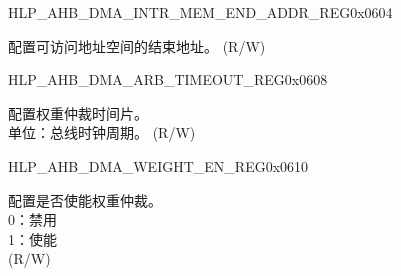 \begin{register}{H}{LP\_AHB\_DMA\_INTR\_MEM\_END\_ADDR\_REG}{0x0604}\label{regdesc:LPAHBDMAINTRMEMENDADDRREG}
%
\regnewline%
\begin{regdesc}\begin{reglist}
\label{fielddesc:LPAHBDMAACCESSINTRMEMENDADDR}\item [LP\_AHB\_DMA\_ACCESS\_INTR\_MEM\_END\_ADDR] 配置可访问地址空间的结束地址。 (R/W)
\end{reglist}\end{regdesc}
\end{register}


\begin{register}{H}{LP\_AHB\_DMA\_ARB\_TIMEOUT\_REG}{0x0608}\label{regdesc:LPAHBDMAARBTIMEOUTREG}
%
%
\regnewline%
\begin{regdesc}\begin{reglist}
\label{fielddesc:LPAHBDMAARBTIMEOUT}\item [LP\_AHB\_DMA\_ARB\_TIMEOUT] 配置权重仲裁时间片。\\单位：总线时钟周期。 (R/W)
\end{reglist}\end{regdesc}
\end{register}


\begin{register}{H}{LP\_AHB\_DMA\_WEIGHT\_EN\_REG}{0x0610}\label{regdesc:LPAHBDMAWEIGHTENREG}
%
%
\regnewline%
\begin{regdesc}\begin{reglist}
\label{fielddesc:LPAHBDMAWEIGHTEN}\item [LP\_AHB\_DMA\_WEIGHT\_EN] 配置是否使能权重仲裁。\\0：禁用\\1：使能\\ (R/W)
\end{reglist}\end{regdesc}
\end{register}



